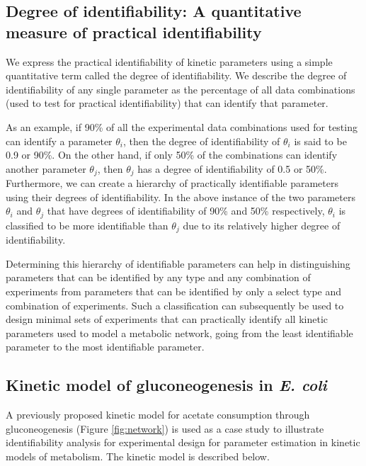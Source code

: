 \documentclass[10pt]{article}
\begin{document}
	\subsection{Degree of identifiability: A quantitative measure of practical identifiability}\label{sec:degree_of_identifiability}
	We express the practical identifiability of kinetic parameters using a simple quantitative term called the degree of identifiability. We describe the degree of identifiability of any single parameter as the percentage of all data combinations (used to test for practical identifiability) that can identify that parameter. 
	
	As an example, if 90\% of all the experimental data combinations used for testing can identify a parameter $\theta_i$, then the degree of identifiability of $\theta_i$ is said to be 0.9 or 90\%. On the other hand, if only 50\% of the combinations can identify another parameter $\theta_j$, then $\theta_j$ has a degree of identifiability of 0.5 or 50\%. Furthermore, we can create a hierarchy of practically identifiable parameters using their degrees of identifiability. In the above instance of the two parameters $\theta_i$ and $\theta_j$ that have degrees of identifiability of 90\% and 50\% respectively, $\theta_i$ is classified to be more identifiable than $\theta_j$ due to its relatively higher degree of identifiability. 
	
	Determining this hierarchy of identifiable parameters can help in distinguishing parameters that can be identified by any type and any combination of experiments from parameters that can be identified by only a select type and combination of experiments. Such a classification can subsequently be used to design minimal sets of experiments that can practically identify all kinetic parameters used to model a metabolic network, going from the least identifiable parameter to the most identifiable parameter.  
	
	\subsection{Kinetic model of gluconeogenesis in \textit{E. coli}}\label{sec:small-model}
	A previously proposed kinetic model \parencite{Kotte2014, Srinivasan2017} for acetate consumption through gluconeogenesis (Figure \ref{fig:network}) is used as a case study to illustrate identifiability analysis for experimental design for parameter estimation in kinetic models of metabolism. The kinetic model is described below.
	
\end{document}
